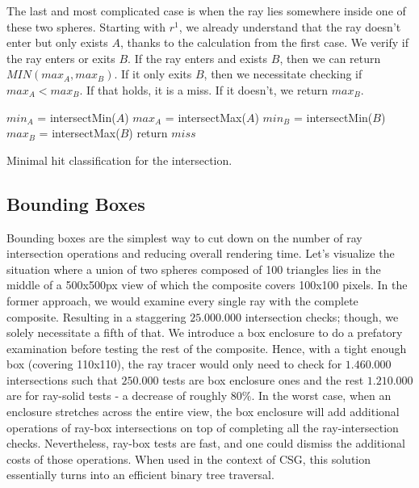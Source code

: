 \documentclass[a4paper,11pt,oneside]{article}
\begin{document}
The last and most complicated case is when the ray lies somewhere inside one of these two spheres. Starting with $r^1$, we already understand that the ray doesn't enter but only exists $A$, thanks to the calculation from the first case. We verify if the ray enters or exits $B$. If the ray enters and exists $B$, then we can return $MIN(max_{A}, max_{B})$. If it only exits $B$, then we necessitate checking if $max_A < max_B$. If that holds, it is a miss. If it doesn't, we return $max_B$.

\begin{algorithm}
	\SetAlgoLined
	$min_A$ = intersectMin($A$)\;
	$max_A$ = intersectMax($A$)\;
	$min_B$ = intersectMin($B$)\;
	$max_B$ = intersectMax($B$)\;
	return $miss$\;
	\caption{Minimal hit classification for the intersection.}
	\label{sec3.4:difference_algo}
\end{algorithm} 


\subsection{Bounding Boxes}

Bounding boxes are the simplest way to cut down on the number of ray intersection operations and reducing overall rendering time. Let's visualize the situation where a union of two spheres composed of 100 triangles lies in the middle of a 500x500px view of which the composite covers 100x100 pixels. In the former approach, we would examine every single ray with the complete composite. Resulting in a staggering $25.000.000$ intersection checks; though,  we solely necessitate a fifth of that. We introduce a box enclosure to do a prefatory examination before testing the rest of the composite. Hence, with a tight enough box (covering 110x110), the ray tracer would only need to check for $1.460.000$ intersections such that $250.000$ tests are box enclosure ones and the rest $1.210.000$ are for ray-solid tests - a decrease of roughly $80\%$. In the worst case, when an enclosure stretches across the entire view, the box enclosure will add additional operations of ray-box intersections on top of completing all the ray-intersection checks. Nevertheless, ray-box tests are fast, and one could dismiss the additional costs of those operations. When used in the context of CSG, this solution essentially turns into an efficient binary tree traversal. 
\end{document}
